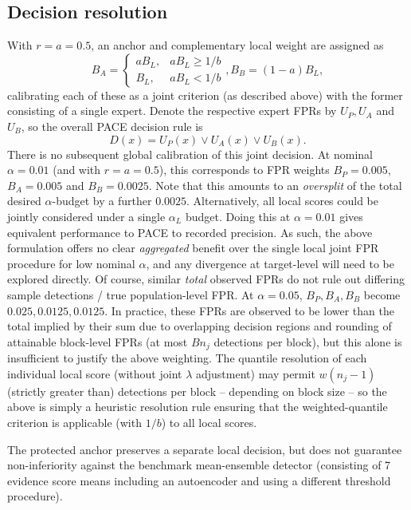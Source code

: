 \subsection{Decision resolution} 
With $r=a=0.5$, an anchor and complementary local weight are assigned as
\begin{equation} 
B_A=\begin{cases} aB_L, & aB_L\ge 1/b\\ B_L,& aB_L < 1/b\end{cases}, B_B = (1-a)B_L,
\label{eq:allocation} 
\end{equation} 
calibrating each of these as a joint criterion (as described above) with the former consisting of a single expert. Denote the respective expert FPRs by $U_P, U_A$ and $U_B$, so the overall PACE decision rule is
\begin{equation} 
D(x) = U_P(x) \vee U_A(x) \vee U_B(x). 
\label{eq:decision} 
\end{equation} 
There is no subsequent global calibration of this joint decision. At nominal $\alpha=0.01$ (and with $r=a=0.5$), this corresponds to FPR weights $B_P=0.005$, $B_A=0.005$ and $B_B=0.0025$. Note that this amounts to an \emph{oversplit} of the total desired $\alpha$-budget by a further $0.0025$. Alternatively, all local scores could be jointly considered under a single $\alpha_L$ budget. Doing this at $\alpha=0.01$ gives equivalent performance to PACE to recorded precision. As such, the above formulation offers no clear \emph{aggregated} benefit over the single local joint FPR procedure for low nominal $\alpha$, and any divergence at target-level will need to be explored directly. Of course, similar \emph{total} observed FPRs do not rule out differing sample detections / true population-level FPR. At $\alpha = 0.05$, $B_P, B_A, B_B$ become $0.025, 0.0125, 0.0125$. In practice, these FPRs are observed to be lower than the total implied by their sum due to overlapping decision regions and rounding of attainable block-level FPRs (at most $Bn_j$ detections per block), but this alone is insufficient to justify the above weighting. The quantile resolution of each individual local score (without joint $\lambda$ adjustment) may permit $w(n_j-1)$ (strictly greater than) detections per block -- depending on block size -- so the above is simply a heuristic resolution rule ensuring that the weighted-quantile criterion is applicable (with $1/b$) to all local scores.

The protected anchor preserves a separate local decision, but does not guarantee non-inferiority against the benchmark mean-ensemble detector (consisting of 7 evidence score means including an autoencoder and using a different threshold procedure).

